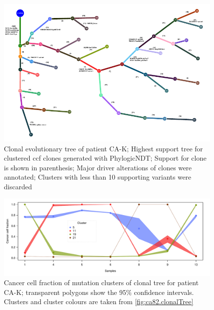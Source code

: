 \begin{figure}[ht]
\centering
\includegraphics[width=.99\linewidth]{Figures/CASCADE/CA82/CA82.clonaltree.pdf}
\caption[Clonal evolutionary tree CA-K]{Clonal evolutionary tree of patient CA-K; Highest support tree for clustered ccf clones generated with PhylogicNDT; Support for clone is shown in parenthesis; Major driver alterations of clones were annotated; Clusters with less than 10 supporting variants were discarded} \label{fig:ca82.clonalTree}
\end{figure}


\begin{figure}[ht]
\centering
\includegraphics[width=.99\linewidth]{Figures/CASCADE/CA82/CA82.ccf_cluster.pdf}
\caption[Cancer cell fraction of mutation clusters of clonal tree for patient CA-K]{Cancer cell fraction of mutation clusters of clonal tree for patient CA-K; transparent polygons show the 95\% confidence intervals. Clusters and cluster colours are taken from \protect\autoref{fig:ca82.clonalTree}} \label{fig:ca82.ccfCluster}
\end{figure}



\cleardoublepage

